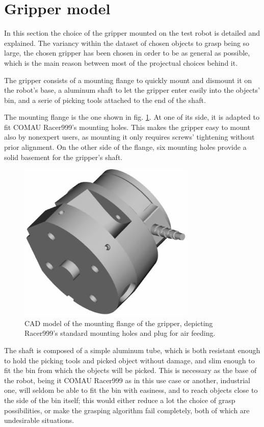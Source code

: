 \section{Gripper model}
In this section the choice of the gripper mounted on the test robot is detailed
and explained. The variancy within the dataset of chosen objects to grasp being
so large, the chosen gripper has been chosen in order to be as general as
possible, which is the main reason between most of the projectual choices behind
it.

The gripper consists of a mounting flange to quickly mount and
dismount it on the robot's base, a aluminum shaft to let the gripper enter
easily into the objects' bin, and a serie of picking tools attached to the end
of the shaft.

The mounting flange is the one shown in fig. \ref{fig:mounting-flange}. At one
of its side, it is adapted to fit COMAU Racer999's mounting holes. This makes
the gripper easy to mount also by nonexpert users, as mounting it only requires
screws' tightening without prior alignment. On the other side of the flange,
six mounting holes provide a solid basement for the gripper's shaft. 

\begin{figure}[htbp] \label{fig:mounting-flange}
  \centering
  \includegraphics[height=3in]{./Graphics/gripper_flange}
  \caption{CAD model of the mounting flange of the gripper, depicting
  Racer999's standard mounting holes and plug for air feeding.}
\end{figure}

The shaft is composed of a simple aluminum tube, which is both resistant enough
to hold the picking tools and picked object without damage, and slim enough to
fit the bin from which the objects will be picked. This is necessary as the
base of the robot, being it COMAU Racer999 as in this use case or another,
industrial one, will seldom be able to fit the bin with easiness, and to reach
objects close to the side of the bin itself; this would either reduce a lot the
choice of grasp possibilities, or make the grasping algorithm fail completely,
both of which are undesirable situations.

